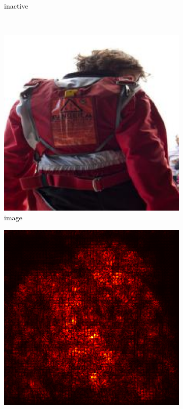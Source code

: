 \documentclass[preprint,12pt]{elsarticle}
\begin{document}
\begin{figure}
\begin{subfigure}{0.14\textwidth}
        \caption{inactive}
    \end{subfigure}\\
    \begin{subfigure}{0.14\linewidth}
        \centering
        \includegraphics[width=\linewidth]{../visualizations/examples/imagenette/resnet18/images/8.png}
        \caption{image}
    \end{subfigure}
    \hfill
    \begin{subfigure}{0.14\linewidth}
        \centering
        \includegraphics[width=\linewidth]{../visualizations/examples/imagenette/resnet18/saliency_map/8.png}

\end{subfigure}
\end{figure}
\end{document}
